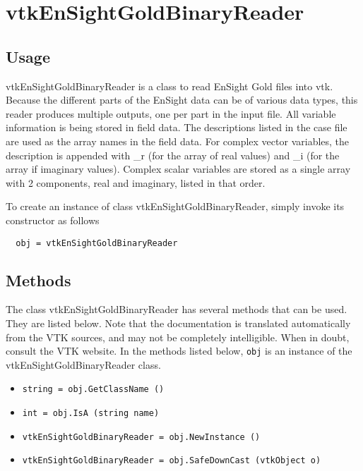 \section{vtkEnSightGoldBinaryReader}

\subsection{Usage}

 vtkEnSightGoldBinaryReader is a class to read EnSight Gold files into vtk.
 Because the different parts of the EnSight data can be of various data
 types, this reader produces multiple outputs, one per part in the input
 file.
 All variable information is being stored in field data.  The descriptions
 listed in the case file are used as the array names in the field data.
 For complex vector variables, the description is appended with \_r (for the
 array of real values) and \_i (for the array if imaginary values).  Complex
 scalar variables are stored as a single array with 2 components, real and
 imaginary, listed in that order.

To create an instance of class vtkEnSightGoldBinaryReader, simply
invoke its constructor as follows
\begin{verbatim}
  obj = vtkEnSightGoldBinaryReader
\end{verbatim}
\subsection{Methods}

The class vtkEnSightGoldBinaryReader has several methods that can be used.
  They are listed below.
Note that the documentation is translated automatically from the VTK sources,
and may not be completely intelligible.  When in doubt, consult the VTK website.
In the methods listed below, \verb|obj| is an instance of the vtkEnSightGoldBinaryReader class.
\begin{itemize}
\item  \verb|string = obj.GetClassName ()|

\item  \verb|int = obj.IsA (string name)|

\item  \verb|vtkEnSightGoldBinaryReader = obj.NewInstance ()|

\item  \verb|vtkEnSightGoldBinaryReader = obj.SafeDownCast (vtkObject o)|

\end{itemize}
